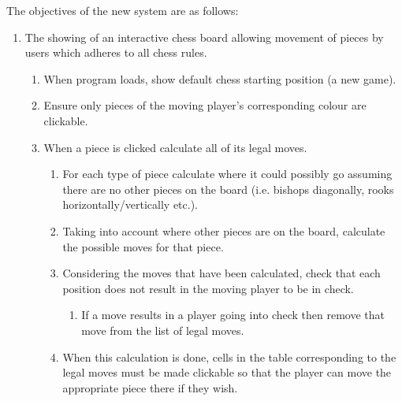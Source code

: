 \documentclass[]{report}
\begin{document}
The objectives of the new system are as follows:
\begin{enumerate}
	\item The showing of an interactive chess board allowing movement of pieces by users which adheres to all chess rules.
	\begin{enumerate}
		\item When program loads, show default chess starting position (a new game).
		\item Ensure only pieces of the moving player’s corresponding colour are clickable.
		\item When a piece is clicked calculate all of its legal moves.
		\begin{enumerate}
			\item For each type of piece calculate where it could possibly go assuming there are no other pieces on the board (i.e. bishops diagonally, rooks horizontally/vertically etc.).
			\item Taking into account where other pieces are on the board, calculate the possible moves for that piece.
			\item Considering the moves that have been calculated, check that each position does not result in the moving player to be in check. 
			\begin{enumerate}
				\item If a move results in a player going into check then remove that move from the list of legal moves.
			\end{enumerate}
			\item When this calculation is done, cells in the table corresponding to the legal moves must be made clickable so that the player can move the appropriate piece there if they wish.
			

\end{enumerate}
\end{enumerate}
\end{enumerate}
\end{document}
